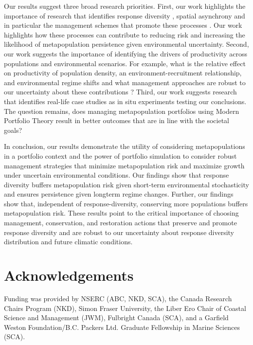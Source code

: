 Our results suggest three broad research priorities. First, our work highlights the importance of research that identifies response diversity \citep[e.g.][]{eliason2011}, spatial asynchrony \citep[e.g.][]{thorson2013} and in particular the management schemes that promote these processes \citep{moore2010}. Our work highlights how these processes can contribute to reducing risk and increasing the likelihood of metapopulation persistence given environmental uncertainty. Second, our work suggests the importance of identifying the drivers of productivity across populations and environmental scenarios. For example, what is the relative effect on productivity of population density, an environment-recruitment relationship, and environmental regime shifts and what management approaches are robust to our uncertainty about these contributions \citep{vert-pre2013}? Third, our work suggests research that identifies real-life case studies as in situ experiments testing our conclusions. The question remains, does managing metapopulation portfolios using Modern Portfolio Theory result in better outcomes that are in line with the societal goals?

In conclusion, our results demonstrate the utility of considering metapopulations in a portfolio context and the power of portfolio simulation to consider robust management strategies that minimize metapopulation risk and maximize growth under uncertain environmental conditions. Our findings show that response diversity buffers metapopulation risk given short-term environmental stochasticity and ensures persistence given longterm regime changes. Further, our findings show that, independent of response-diversity, conserving more populations buffers metapopulation risk. These results point to the critical importance of choosing management, conservation, and restoration actions that preserve and promote response diversity and are robust to our uncertainty about response diversity distribution and future climatic conditions.

\section{Acknowledgements}

Funding was provided by NSERC (ABC, NKD, SCA), the Canada Research Chairs Program (NKD), Simon Fraser University, the Liber Ero Chair of Coastal Science and Management (JWM), Fulbright Canada (SCA), and a Garfield Weston Foundation/B.C. Packers Ltd. Graduate Fellowship in Marine Sciences (SCA).

